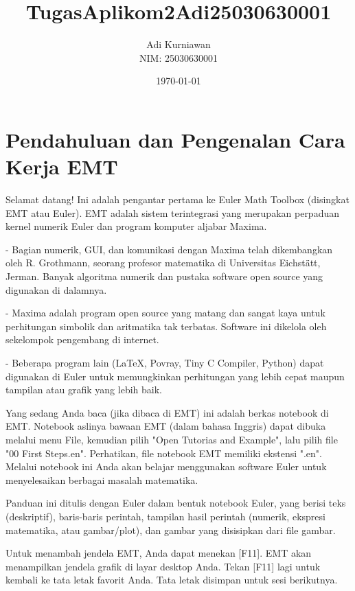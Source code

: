 \documentclass{article}
\title{TugasAplikom2Adi25030630001}
\author{Adi Kurniawan \\ NIM: 25030630001}
\date{\today}
\newenvironment{eulernotebook}{\par}{\par}
\newcommand{\eulerheading}[1]{\section{#1}}
\newenvironment{eulercomment}{\par\medskip}{\par\medskip}
\begin{document}
\maketitle

\begin{eulernotebook}
\eulerheading{Pendahuluan dan Pengenalan Cara Kerja EMT}
\begin{eulercomment}
Selamat datang! Ini adalah pengantar pertama ke Euler Math Toolbox
(disingkat EMT atau Euler). EMT adalah sistem terintegrasi yang
merupakan perpaduan kernel numerik Euler dan program komputer aljabar
Maxima.

- Bagian numerik, GUI, dan komunikasi dengan Maxima telah dikembangkan
oleh R. Grothmann, seorang profesor matematika di Universitas
Eichstätt, Jerman. Banyak algoritma numerik dan pustaka software open
source yang digunakan di dalamnya.

- Maxima adalah program open source yang matang dan sangat kaya untuk
perhitungan simbolik dan aritmatika tak terbatas. Software ini
dikelola oleh sekelompok pengembang di internet.

- Beberapa program lain (LaTeX, Povray, Tiny C Compiler, Python) dapat
digunakan di Euler untuk memungkinkan perhitungan yang lebih cepat
maupun tampilan atau grafik yang lebih baik.

Yang sedang Anda baca (jika dibaca di EMT) ini adalah berkas notebook
di EMT. Notebook aslinya bawaan EMT (dalam bahasa Inggris) dapat
dibuka melalui menu File, kemudian pilih "Open Tutorias and Example",
lalu pilih file "00 First Steps.en". Perhatikan, file notebook EMT
memiliki ekstensi ".en". Melalui notebook ini Anda akan belajar
menggunakan software Euler untuk menyelesaikan berbagai masalah
matematika.
\end{eulercomment}
\begin{eulercomment}
Panduan ini ditulis dengan Euler dalam bentuk notebook Euler, yang
berisi teks (deskriptif), baris-baris perintah, tampilan hasil
perintah (numerik, ekspresi matematika, atau gambar/plot), dan gambar
yang disisipkan dari file gambar.

Untuk menambah jendela EMT, Anda dapat menekan [F11]. EMT akan
menampilkan jendela grafik di layar desktop Anda. Tekan [F11] lagi
untuk kembali ke tata letak favorit Anda. Tata letak disimpan untuk
sesi berikutnya.


\end{eulercomment}
\end{eulernotebook}
\end{document}
